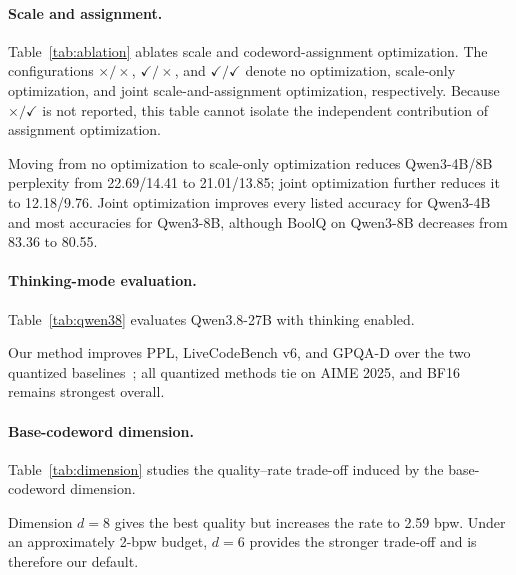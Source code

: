 \paragraph{Scale and assignment.} Table~\ref{tab:ablation} ablates scale and codeword-assignment optimization. The configurations $\times/\times$, $\checkmark/\times$, and $\checkmark/\checkmark$ denote no optimization, scale-only optimization, and joint scale-and-assignment optimization, respectively. Because $\times/\checkmark$ is not reported, this table cannot isolate the independent contribution of assignment optimization.


Moving from no optimization to scale-only optimization reduces Qwen3-4B/8B perplexity from 22.69/14.41 to 21.01/13.85; joint optimization further reduces it to 12.18/9.76. Joint optimization improves every listed accuracy for Qwen3-4B and most accuracies for Qwen3-8B, although BoolQ on Qwen3-8B decreases from 83.36 to 80.55.

\paragraph{Thinking-mode evaluation.} Table~\ref{tab:qwen38} evaluates Qwen3.8-27B with thinking enabled.


Our method improves PPL, LiveCodeBench v6, and GPQA-D over the two quantized baselines~\cite{livecodebench,gpqa}; all quantized methods tie on AIME 2025, and BF16 remains strongest overall.

\paragraph{Base-codeword dimension.} Table~\ref{tab:dimension} studies the quality--rate trade-off induced by the base-codeword dimension.


Dimension $d=8$ gives the best quality but increases the rate to 2.59 bpw. Under an approximately 2-bpw budget, $d=6$ provides the stronger trade-off and is therefore our default.

